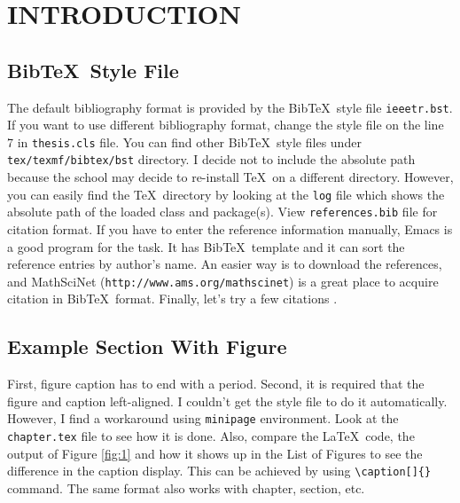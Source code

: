 \chapter{INTRODUCTION}

\section{Bib\TeX\ Style File}

The default bibliography format is provided by the Bib\TeX\ style file \verb#ieeetr.bst#. If you want to use different bibliography format, change the style file on the line 7 in \verb#thesis.cls# file. You can find other Bib\TeX\ style files under \verb#tex/texmf/bibtex/bst# directory. I decide not to include the absolute path because the school may decide to re-install \TeX\ on a different directory. However, you can easily find the \TeX\ directory by looking at the \verb#log# file which shows the absolute path of the loaded class and package(s). View \verb#references.bib# file for citation format. If you have to enter the reference information manually, Emacs is a good program for the task. It has Bib\TeX\ template and it can sort the reference entries by author's name. An easier way is to download the references, and MathSciNet (\verb#http://www.ams.org/mathscinet#) is a great place to acquire citation in Bib\TeX\ format. Finally, let's try a few citations \cite{ALBERTSETAL:1994,FERSHT:1985,FISCHER:1987a,KAUFFMAN:1969,MR1191182,MR1617060}.

\section{Example Section With Figure}

First, figure caption has to end with a period. Second, it is required that the figure and caption left-aligned. I couldn't get the style file to do it automatically. However, I find a workaround using \verb#minipage# environment. Look at the \verb#chapter.tex# file to see how it is done. Also, compare the \LaTeX\ code, the output of Figure \ref{fig:1} and how it shows up in the List of Figures to see the difference in the caption display. This can be achieved by using \verb#\caption[]{}# command. The same format also works with chapter, section, etc.


